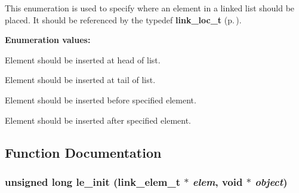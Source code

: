  This enumeration is used to specify where an element in a linked list should be placed. It should be referenced by the typedef {\bf link\_\-loc\_\-t} {\rm (p.\,\pageref{group__dbprim__link_a4})}. \begin{Desc}
\item[{\bf Enumeration values:}]\par
\begin{description}
\item[
{\em LINK\_\-LOC\_\-HEAD}\label{group__dbprim__link_a26a98}
]Element should be inserted at head of list. \item[
{\em LINK\_\-LOC\_\-TAIL}\label{group__dbprim__link_a26a99}
]Element should be inserted at tail of list. \item[
{\em LINK\_\-LOC\_\-BEFORE}\label{group__dbprim__link_a26a100}
]Element should be inserted before specified element. \item[
{\em LINK\_\-LOC\_\-AFTER}\label{group__dbprim__link_a26a101}
]Element should be inserted after specified element. \end{description}
\end{Desc}



\subsection{Function Documentation}
\subsubsection{\setlength{\rightskip}{0pt plus 5cm}unsigned long le\_\-init ({\bf link\_\-elem\_\-t} $\ast$ {\em elem}, void $\ast$ {\em object})}\label{group__dbprim__link_a12}




